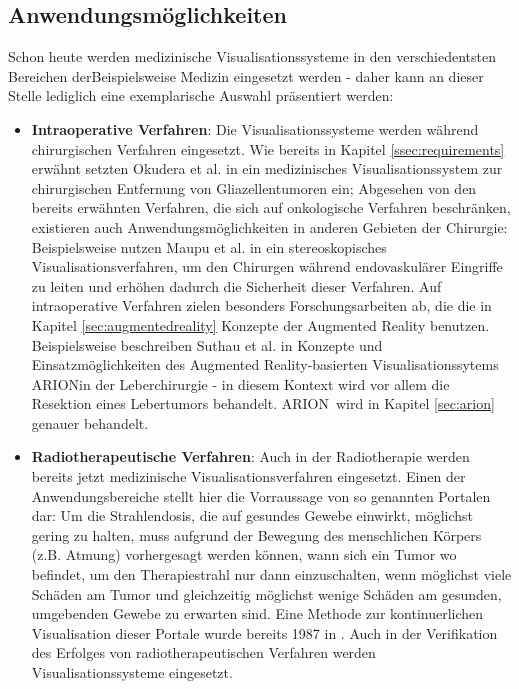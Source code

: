 \documentclass[pdftex,a4paper,titlepage,12pt]{scrartcl}
\newtheorem[L]{boxedDefinition}{Definition}
\begin{document}
\subsection{Anwendungsmöglichkeiten}\label{ssec:applications}
Schon heute werden medizinische Visualisationssysteme in den verschiedentsten Bereichen derBeispielsweise Medizin eingesetzt werden - daher kann an dieser Stelle lediglich eine exemplarische Auswahl präsentiert werden:
\begin{itemize}
 \item \textbf{Intraoperative Verfahren}: Die Visualisationssysteme werden während chirurgischen Verfahren eingesetzt. Wie bereits in Kapitel \ref{ssec:requirements} erwähnt setzten Okudera et al. in \cite{Okudera1994} ein medizinisches Visualisationssystem zur chirurgischen Entfernung von Gliazellentumoren ein;  Abgesehen von den bereits erwähnten Verfahren, die sich auf onkologische Verfahren beschränken, existieren auch Anwendungsmöglichkeiten in anderen Gebieten der Chirurgie: Beispielsweise nutzen Maupu et al. in \cite{Maupu2005} ein stereoskopisches Visualisationsverfahren, um den Chirurgen während endovaskulärer Eingriffe zu leiten und erhöhen dadurch die Sicherheit dieser Verfahren. Auf intraoperative Verfahren zielen besonders Forschungsarbeiten ab, die die in Kapitel \vref{sec:augmentedreality} Konzepte der Augmented Reality benutzen. Beispielsweise beschreiben Suthau et al. in \cite{Suthau2002DE}  Konzepte und Einsatzmöglichkeiten des Augmented Reality-basierten Visualisationssytems ARION\texttrademark in der Leberchirurgie - in diesem Kontext wird vor allem die Resektion eines Lebertumors behandelt. ARION\texttrademark\ wird in Kapitel \vref{sec:arion} genauer behandelt.
 \item \textbf{Radiotherapeutische Verfahren}: Auch in der Radiotherapie werden bereits jetzt medizinische Visualisationsverfahren eingesetzt. Einen der Anwendungsbereiche stellt hier die Vorraussage von so genannten Portalen dar: Um die Strahlendosis, die auf gesundes Gewebe einwirkt, möglichst gering zu halten, muss aufgrund der Bewegung des menschlichen Körpers (z.B. Atmung) vorhergesagt werden können, wann sich ein Tumor wo befindet, um den Therapiestrahl nur dann einzuschalten, wenn möglichst viele Schäden am Tumor und gleichzeitig möglichst wenige Schäden am gesunden, umgebenden Gewebe zu erwarten sind. Eine Methode zur kontinuerlichen Visualisation dieser Portale wurde bereits 1987 in \cite{Leong1987}. Auch in der Verifikation des Erfolges von radiotherapeutischen Verfahren werden Visualisationssysteme eingesetzt.

\end{itemize}
\end{document}
